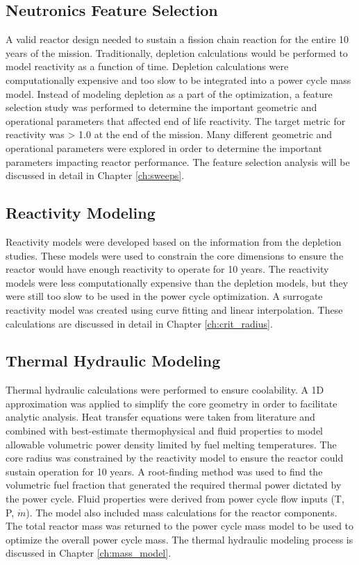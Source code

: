 \subsection{Neutronics Feature Selection}
A valid reactor design needed to sustain a fission chain reaction for the entire
10 years of the mission. Traditionally, depletion calculations would be performed
to model reactivity as a function of time. Depletion calculations were 
computationally expensive and too slow to be integrated into a power cycle mass model. 
Instead of modeling depletion as a part of the optimization, a feature selection 
study was performed to determine the important geometric and operational parameters 
that affected end of life reactivity. The target metric for reactivity 
was \keff > 1.0 at the end of the mission. Many different geometric and
operational parameters were explored in order to determine the important
parameters impacting reactor performance. The feature selection analysis will be
discussed in detail in Chapter \ref{ch:sweeps}.

\subsection{Reactivity Modeling}
Reactivity models were developed based on the information from the depletion
studies. These models were used to constrain the core dimensions to ensure the
reactor would have enough reactivity to operate for 10 years. The reactivity
models were less computationally expensive than the depletion models, but they
were still too slow to be used in the power cycle optimization. A surrogate
reactivity model was created using curve fitting and linear interpolation.
These calculations are discussed in detail in Chapter \ref{ch:crit_radius}.

\subsection{Thermal Hydraulic Modeling}
Thermal hydraulic calculations were performed to ensure coolability. A 1D
approximation was applied to simplify the core geometry in order to facilitate analytic
analysis. Heat transfer equations were taken from literature and combined with
best-estimate thermophysical and fluid properties to model allowable volumetric
power density limited by fuel melting temperatures. The core radius was
constrained by the reactivity model to ensure the reactor could sustain operation
for 10 years. A root-finding method was used to find the volumetric fuel
fraction that generated the required thermal power dictated by the power cycle.
Fluid properties were derived from power cycle flow inputs (T, P, $\dot{m}$).
The model also included mass calculations for the reactor components. 
The total reactor mass was returned to the power cycle mass model to be used to 
optimize the overall power cycle mass. The thermal hydraulic modeling process 
is discussed in Chapter \ref{ch:mass_model}.

